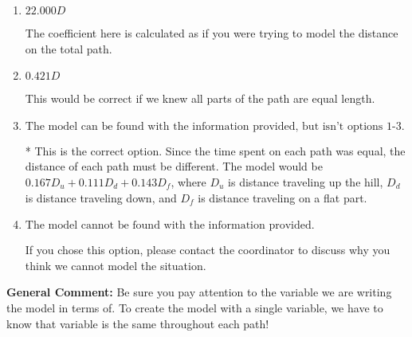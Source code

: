 \documentclass{extbook}[14pt]
\begin{document}
\begin{enumerate}
{\begin{enumerate}[label=\Alph*.]
The coefficient here is calculated by multiplying the distances together rather than adding.
\item \( 22.000 D \)

The coefficient here is calculated as if you were trying to model the distance on the total path.
\item \( 0.421 D \)

This would be correct if we knew all parts of the path are equal length.
\item \( \text{The model can be found with the information provided, but isn't options 1-3.} \)

* This is the correct option. Since the time spent on each path was equal, the distance of each path must be different. The model would be $0.167D_u + 0.111D_d + 0.143D_f$, where $D_u$ is distance traveling up the hill, $D_d$ is distance traveling down, and $D_f$ is distance traveling on a flat part.
\item \( \text{The model cannot be found with the information provided.} \)

If you chose this option, please contact the coordinator to discuss why you think we cannot model the situation.
\end{enumerate}

\textbf{General Comment:} Be sure you pay attention to the variable we are writing the model in terms of. To create the model with a single variable, we have to know that variable is the same throughout each path!
}
\end{enumerate}
\end{document}
